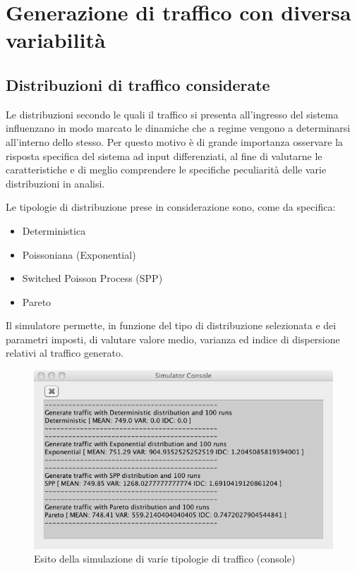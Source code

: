 \chapter{Generazione di traffico con diversa variabilit\`a}

\section{Distribuzioni di traffico considerate}

Le distribuzioni secondo le quali il traffico si presenta all'ingresso del sistema influenzano in modo marcato le dinamiche che a regime vengono a determinarsi all'interno dello stesso. Per questo motivo \`e di grande importanza osservare la risposta specifica del sistema ad input differenziati, al fine di valutarne le caratteristiche e di meglio comprendere le specifiche peculiarit\`a delle varie distribuzioni in analisi.

Le tipologie di distribuzione prese in considerazione sono, come da specifica:
\begin{itemize}
\item Deterministica 
\item Poissoniana (Exponential)
\item Switched Poisson Process (SPP) 
\item Pareto
\end{itemize}

Il simulatore permette, in funzione del tipo di distribuzione selezionata e dei parametri imposti, di valutare valore medio, varianza ed indice di dispersione relativi al traffico generato.

\begin{figure}[!h]{
	\begin{center}
	   \includegraphics[width=\textwidth]{figures/simconsole.png}
	\end{center}}
	\caption{Esito della simulazione di varie tipologie di traffico (console)}
	\label{fig:console}
\end{figure}


